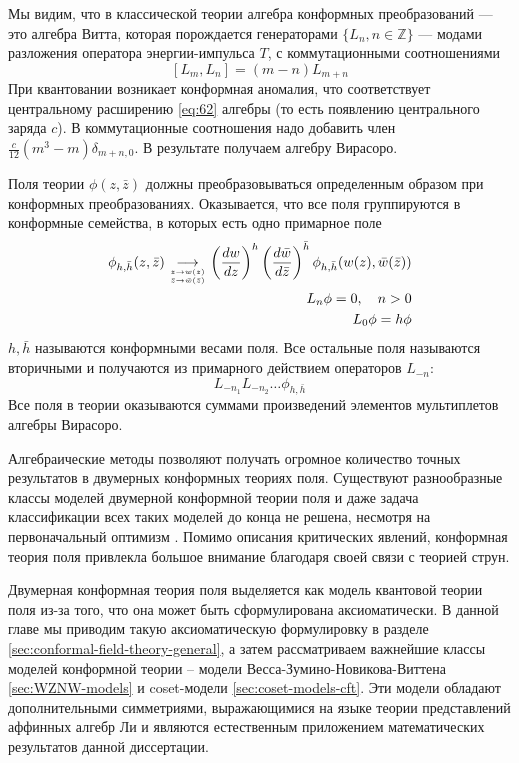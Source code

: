 Мы видим, что в классической теории алгебра конформных преобразований --- это алгебра Витта, которая
порождается генераторами $\{L_n, n\in \mathbb{Z}\}$ --- модами разложения оператора энергии-импульса $T$, с
коммутационными соотношениями
\begin{equation}
  \label{eq:2}
  [L_m,L_n]=(m-n)L_{m+n}
\end{equation}
При квантовании возникает конформная аномалия, что соответствует центральному расширению \eqref{eq:62} алгебры  (то
есть появлению центрального заряда $c$). В коммутационные соотношения надо добавить член
$\frac{c}{12}(m^3-m)\delta_{m+n,0}$. В результате получаем алгебру Вирасоро.

Поля теории $\phi(z,\bar z)$ должны преобразовываться определенным образом при конформных преобразованиях.
Оказывается, что все поля группируются в конформные семейства, в которых есть одно примарное поле
\begin{equation}
  \label{eq:3}
  \begin{split}
    \phi_{h,\bar h}(z,\bar z)\underset{
      \genfrac{}{}{0pt}{}{z\to w(z)}
        {\bar z \to \bar w(\bar z)}
    }
    {\longrightarrow} \left(\frac{dw}{dz}\right)^{h}\left(\frac{d\bar w}{d\bar
        z}\right)^{\bar h}\phi_{h,\bar h}(w(z),\bar w(\bar z))\\
    L_n \phi=0,\quad n>0\\
    L_0 \phi=h \phi\\
  \end{split}
\end{equation}
$h, \bar h$ называются конформными весами поля.
Все остальные поля называются вторичными и получаются из примарного действием операторов $L_{-n}$:
\begin{equation}
  \label{eq:67}
  L_{-n_1}L_{-n_2}\dots \phi_{h,\bar h}
\end{equation}
Все поля в теории оказываются суммами произведений элементов мультиплетов алгебры Вирасоро.

Алгебраические методы позволяют получать огромное количество точных результатов в двумерных конформных теориях поля. Существуют разнообразные классы моделей двумерной конформной теории поля и даже задача классификации всех таких моделей до конца не решена, несмотря на первоначальный оптимизм \cite{moore1989taming}.  Помимо описания критических явлений, конформная теория поля привлекла большое внимание благодаря своей связи с теорией струн.

Двумерная конформная теория поля выделяется как модель квантовой теории поля из-за того, что она может быть сформулирована аксиоматически. В данной главе мы приводим такую аксиоматическую формулировку в разделе \ref{sec:conformal-field-theory-general}, а затем рассматриваем важнейшие классы моделей конформной теории -- модели Весса-Зумино-Новикова-Виттена \ref{sec:WZNW-models} и coset-модели \ref{sec:coset-models-cft}. Эти модели обладают дополнительными симметриями, выражающимися на языке теории представлений аффинных алгебр Ли и являются естественным приложением математических результатов данной диссертации. 

